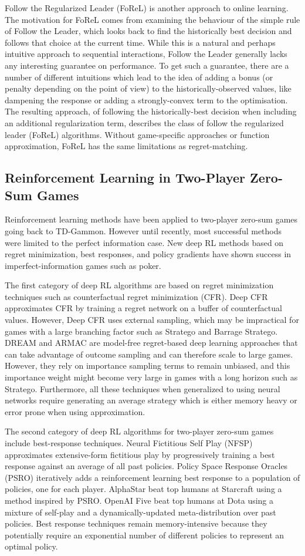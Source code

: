 Follow the Regularized Leader (FoReL) is another approach to online learning. The motivation for FoReL comes from examining the behaviour of the simple rule of Follow the Leader, which looks back to find the historically best decision and follows that choice at the current time. While this is a natural and perhaps intuitive approach to sequential interactions, Follow the Leader generally lacks any interesting guarantee on performance. To get such a guarantee, there are a number of different intuitions which lead to the idea of adding a bonus (or penalty depending on the point of view) to the historically-observed values, like dampening the response or adding a strongly-convex term to the optimisation. The resulting approach, of following the historically-best decision when including an additional regularization term, describes the class of follow the regularized leader (FoReL) algorithms. Without game-specific approaches or function approximation, FoReL has the same limitations as regret-matching.

\subsection{Reinforcement Learning in Two-Player Zero-Sum Games}
Reinforcement learning methods have been applied to two-player zero-sum games going back to TD-Gammon. However until recently, most successful methods were limited to the perfect information case. New deep RL methods based on regret minimization, best responses, and policy gradients have shown success in imperfect-information games such as poker.

The first category of deep RL algorithms are based on regret minimization techniques such as counterfactual regret minimization (CFR). Deep CFR approximates CFR by training a regret network on a buffer of counterfactual values. However, Deep CFR uses external sampling, which may be impractical for games with a large branching factor such as Stratego and Barrage Stratego. DREAM and ARMAC are model-free regret-based deep learning approaches that can take advantage of outcome sampling and can therefore scale to large games. However, they rely on importance sampling terms to remain unbiased, and this importance weight might become very large in games with a long horizon such as Stratego. Furthermore, all these techniques when generalized to using neural networks require generating an average strategy which is either memory heavy or error prone when using approximation.

The second category of deep RL algorithms for two-player zero-sum games include best-response techniques. Neural Fictitious Self Play (NFSP) approximates extensive-form fictitious play by progressively training a best response against an average of all past policies. Policy Space Response Oracles (PSRO) iteratively adds a reinforcement learning best response to a population of policies, one for each player. AlphaStar beat top humans at Starcraft using a method inspired by PSRO. OpenAI Five beat top humans at Dota using a mixture of self-play and a dynamically-updated meta-distribution over past policies. Best response techniques remain memory-intensive because they potentially require an exponential number of different policies to represent an optimal policy.

